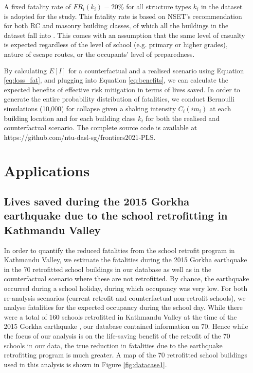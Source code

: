 A fixed fatality rate of $FR_{i}(k_{i}) = 20\%$ for all structure types $k_{i}$ in the dataset is adopted for the study. This fatality rate is based on NSET's recommendation for both RC and masonry building classes, of which all the buildings in the dataset fall into \citep{nset2000}. This comes with an assumption that the same level of casualty is expected regardless of the level of school (e.g. primary or higher grades), nature of escape routes, or the occupants' level of preparedness.

By calculating $E[I]$ for a counterfactual and a realised scenario using Equation \ref{eq:loss_fat}, and plugging into Equation \ref{eq:benefits}, we can calculate the expected benefits of effective risk mitigation in terms of lives saved. In order to generate the entire probability distribution of fatalities, we conduct Bernoulli simulations (10,000) for collapse given a shaking intensity $C_{i}(im_{i})$ at each building location and for each building class $k_{i}$ for both the realised and counterfactual scenario. The complete source code is available at https://github.com/ntu-dasl-sg/frontiers2021-PLS.

 
\section{Applications}
\label{section-apps}

\subsection{Lives saved during the 2015 Gorkha earthquake due to the school retrofitting in Kathmandu Valley}
\label{section-case1}

In order to quantify the reduced fatalities from the school retrofit program in Kathmandu Valley, we estimate the fatalities during the 2015 Gorkha earthquake in the 70 retrofitted school buildings in our database as well as in the counterfactual scenario where these are not retrofitted. By chance, the earthquake occurred during a school holiday, during which occupancy was very low. For both re-analysis scenarios (current retrofit and counterfactual non-retrofit schools), we analyse fatalities for the expected occupancy during the school day. While there were a total of 160 schools retrofitted in  Kathmandu Valley at the time of the 2015 Gorkha earthquake \citep{marasini_2019}, our database contained information on 70. Hence while the focus of our analysis is on the life-saving benefit of the retrofit of the 70 schools in our data, the true reduction in fatalities due to the earthquake retrofitting program is much greater. A map of the 70 retrofitted school buildings used in this analysis is shown in  Figure \ref{fig:datacase1}.

